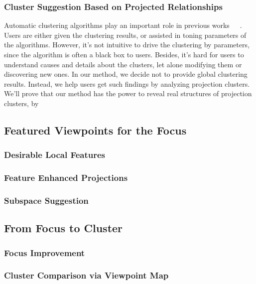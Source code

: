 \subsubsection{Cluster Suggestion Based on Projected Relationships}
Automatic clustering algorithms play an important role in previous works~\cite{DBLP:conf/ieeevast/NamHMZI07}~\cite{DBLP:journals/cgf/LeeKCSP12}~\cite{DBLP:journals/cgf/LiuWTBP15}. Users are either given the clustering results, or assisted in toning parameters of the algorithms. However, it's not intuitive to drive the clustering by parameters, since the algorithm is often a black box to users. Besides, it's hard for users to understand causes and details about the clusters, let alone modifying them or discovering new ones. In our method, we decide not to provide global clustering results. Instead, we help users get such findings by analyzing projection clusters. We'll prove that our method has the power to reveal real structures of projection clusters, by

\subsection{Featured Viewpoints for the Focus}

\subsubsection{Desirable Local Features}
\subsubsection{Feature Enhanced Projections}
\subsubsection{Subspace Suggestion}
\subsection{From Focus to Cluster}
\subsubsection{Focus Improvement}
\subsubsection{Cluster Comparison via Viewpoint Map}
